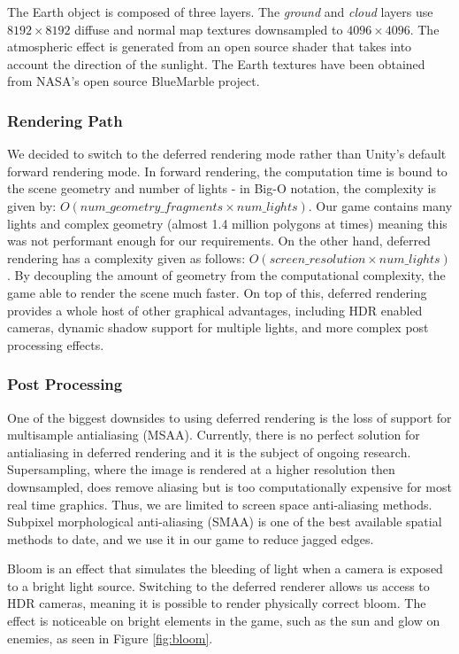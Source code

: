 \documentclass[a4paper,11pt]{article}
\begin{document}
The Earth object is composed of three layers. The \emph{ground} and \emph{cloud} layers use $8192 \times 8192$ diffuse and normal map textures downsampled to $4096 \times 4096$. The atmospheric effect is generated from an open source shader \cite{atmospheric_shader} that takes into account the direction of the sunlight. The Earth textures have been obtained from NASA’s open source BlueMarble \cite{blue_marble} project.

\subsubsection{Rendering Path}
We decided to switch to the deferred rendering mode rather than Unity’s default forward rendering mode. In forward rendering, the computation time is bound to the scene geometry and number of lights - in Big-O notation, the complexity is given by: $O(num\_geometry\_fragments \times num\_lights)$. Our game contains many lights and complex geometry (almost 1.4 million polygons at times) meaning this was not performant enough for our requirements. On the other hand, deferred rendering has a complexity given as follows\cite{unity_deferred}: $O(screen\_resolution \times num\_lights)$. By decoupling the amount of geometry from the computational complexity, the game able to render the scene much faster. On top of this, deferred rendering provides a whole host of other graphical advantages, including HDR enabled cameras, dynamic shadow support for multiple lights, and more complex post processing effects.

\subsubsection{Post Processing}
One of the biggest downsides to using deferred rendering is the loss of support for multisample antialiasing (MSAA). Currently, there is no perfect solution for antialiasing in deferred rendering and it is the subject of ongoing research. Supersampling, where the image is rendered at a higher resolution then downsampled, does remove aliasing but is too computationally expensive for most real time graphics. Thus, we are limited to screen space anti-aliasing methods. Subpixel morphological anti-aliasing (SMAA) is one of the best available spatial methods to date, and we use it in our game to reduce jagged edges.

Bloom is an effect that simulates the bleeding of light when a camera is exposed to a bright light source. Switching to the deferred renderer allows us access to HDR cameras, meaning it is possible to render physically correct bloom. The effect is noticeable on bright elements in the game, such as the sun and glow on enemies, as seen in Figure \ref{fig:bloom}.
\end{document}
